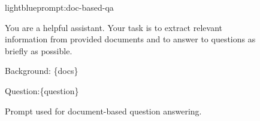 \documentclass{applemlr}
\numberwithin{equation}{section}
\begin{document}
\begin{figure}[t]
\centering
\begin{minipage}{0.95\textwidth}
\begin{promptbox}[\color{black}{Prompt for Document-based QA}]{lightblue}{prompt:doc-based-qa}
\label{temp:doc_based_qa_prompt}

\ttfamily
You are a helpful assistant. Your task is to extract relevant information from provided documents and to answer to questions as briefly as possible.

Background: \{docs\}

Question:\{question\}
\end{promptbox}
\end{minipage}
\caption{Prompt used for document-based question answering.}
\label{prompt_doc_based_qa}
\end{figure}
\end{document}
